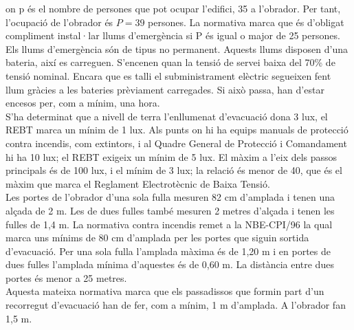 \noindent on p és el nombre de persones que pot ocupar l'edifici, 35 a l'obrador. Per tant, l'ocupació de l'obrador és $P=39$ persones. La normativa marca que és d'obligat compliment instal·lar llums d'emergència si P és igual o major de 25 persones.\\
\newline Els llums d'emergència són de tipus no permanent. Aquests llums disposen d'una bateria, així es carreguen. S'encenen quan la tensió de servei baixa del 70\% de tensió nominal. Encara que es talli el subministrament elèctric segueixen fent llum gràcies a les bateries prèviament carregades. Si això passa, han d'estar encesos per, com a mínim, una hora.\\
\newline S'ha determinat que a nivell de terra l'enllumenat d'evacuació dona 3 lux, el REBT marca un mínim de 1 lux. Als punts on hi ha equips manuals de protecció contra incendis, com extintors, i al Quadre General de Protecció i Comandament hi ha 10 lux; el REBT exigeix un mínim de 5 lux. El màxim a l'eix dels passos principals és de 100 lux, i el mínim de 3 lux; la relació és menor de 40, que és el màxim que marca el Reglament Electrotècnic de Baixa Tensió.\\
\newline Les portes de l'obrador d'una sola fulla mesuren 82 cm d'amplada i tenen una alçada de 2 m. Les de dues fulles també mesuren 2 metres d'alçada i tenen les fulles de 1,4 m. La normativa contra incendis remet a la NBE-CPI/96 la qual marca uns mínims de 80 cm d'amplada per les portes que siguin sortida d'evacuació. Per una sola fulla l'amplada màxima és de 1,20 m i en portes de dues fulles l'amplada mínima d'aquestes és de 0,60 m. La distància entre dues portes és menor a 25 metres.\\
\newline Aquesta mateixa normativa marca que els passadissos que formin part d'un recorregut d'evacuació han de fer, com a mínim, 1 m d'amplada. A l'obrador fan 1,5 m.

\clearpage